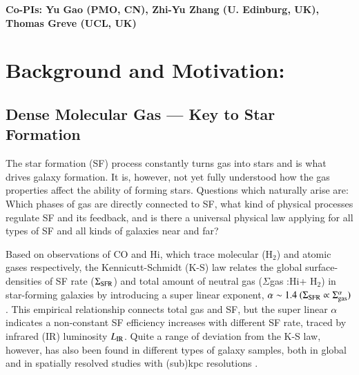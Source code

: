 \documentclass[legal,11pt]{article}
\def\HI{H{\sc i}}
\def\Htwo{H$_2$}
\def\LIR     {$L_{\rm IR}$}
\def\Htwo       {H$_2$}
\begin{document}
\begin{table}[htbp]
\begin{threeparttable}[b]
\begin{tabular}{lcclcc}
\hline
\end{tabular}
 
\begin{tablenotes}
{\bf Co-PIs: Yu Gao (PMO, CN), Zhi-Yu Zhang (U. Edinburg, UK), Thomas Greve (UCL, UK)}\\
\end{tablenotes}
\end{threeparttable}

\end{table}



\clearpage
\justify
\medskip


\section{Background and Motivation:}

\subsection{Dense Molecular Gas --- Key to Star Formation }


The star formation (SF) process constantly turns gas into stars and is what drives galaxy 
formation. It is,
however, not yet fully understood how the gas properties affect the ability of
forming stars. Questions which naturally arise are: Which phases of gas are
directly connected to SF, what kind of physical processes regulate SF and its
feedback, and is there a universal physical law applying for all types of SF
and all kinds of galaxies near and far?   


Based on observations of CO and \HI, which trace molecular (\Htwo) and atomic
gases respectively, the Kennicutt-Schmidt (K-S) law relates the global
surface-densities of SF rate ($\Sigma_{\rm SFR}$) and total amount of neutral
gas ($\Sigma$gas :\HI + \Htwo) in star-forming galaxies by introducing a super
linear exponent, $\alpha \sim 1.4 ~ (\Sigma_{\rm SFR} \propto \Sigma_{\rm
gas}^\alpha)$ \citep{Kennicutt2012}. This empirical relationship connects total
gas and SF, but the super linear $\alpha$ indicates a non-constant SF
efficiency increases with  different SF rate, traced by infrared (IR) luminosity \LIR. Quite a range of
deviation from the K-S law, however, has also been found in different types of
galaxy samples, both in global and in spatially resolved studies with (sub)kpc
resolutions \citep[e.g., see Fig.  \ref{bigiel08}][]{Kennicutt2012,Bigiel2008}.  
\end{document}
